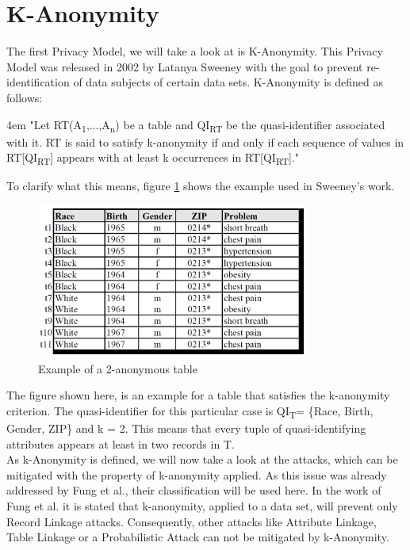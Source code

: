 \documentclass[12pt, a4paper,oneside]{report}
\begin{document}
\section{K-Anonymity} 
The first Privacy Model, we will take a look at is K-Anonymity. This Privacy Model was released in 2002 by Latanya Sweeney with the goal to prevent re-identification of data subjects of certain data sets\cite{SWEENEY2002}. K-Anonymity is defined as follows:\\
\par
\begingroup
\leftskip4em
\rightskip\leftskip
"Let RT(A\textsubscript{1},...,A\textsubscript{n}) be a table and QI\textsubscript{RT} be the quasi-identifier associated with it. RT is said to satisfy k-anonymity if and only if each sequence of values in
RT[QI\textsubscript{RT}] appears with at least k occurrences in RT[QI\textsubscript{RT}]."\cite{SWEENEY2002}\\
\par
\endgroup
To clarify what this means, figure \ref{fig:2} shows the example used in Sweeney's work\cite{SWEENEY2002}.  
\begin{figure}[h]
	\centering
	\includegraphics[width=0.8\textwidth]{k-anonymity-example}
	\caption{Example of a 2-anonymous table \cite{SWEENEY2002}}
	\label{fig:2}
\end{figure}
The figure shown here, is an example for a table that satisfies the k-anonymity criterion. The quasi-identifier for this particular case is QI\textsubscript{T}= \{Race, Birth, Gender, ZIP\} and k = 2. This means that every tuple of quasi-identifying attributes appears at least in two records in T.\\
As k-Anonymity is defined, we will now take a look at the attacks, which can be mitigated with the property of k-anonymity applied. As this issue was already addressed by Fung et al., their classification will be used here. In the work of Fung et al. it is stated that k-anonymity, applied to a data set, will prevent only Record Linkage attacks. Consequently, other attacks like Attribute Linkage, Table Linkage or a Probabilistic Attack can not be mitigated by k-Anonymity\cite{Fung2010}.
\end{document}

